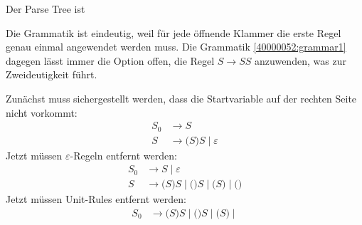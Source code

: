 
\begin{loesung}
\begin{teilaufgaben}
\item Der Parse Tree ist
\begin{center}
\end{center}
\item Die Grammatik ist eindeutig, weil für jede öffnende Klammer die erste 
Regel genau einmal angewendet werden muss. 
Die Grammatik
\eqref{40000052:grammar1} dagegen lässt immer die Option offen, die
Regel $S\to SS$ anzuwenden, was zur Zweideutigkeit führt.
\item Zunächst muss sichergestellt werden, dass die Startvariable auf
der rechten Seite nicht vorkommt:
\begin{align*}
S_0&\rightarrow S
\\
S&\rightarrow \texttt{(} S \texttt{)} S \;|\; \varepsilon
\end{align*}
Jetzt müssen $\varepsilon$-Regeln entfernt werden:
\begin{align*}
S_0&\rightarrow
S
\;|\;
\varepsilon
\\
S&\rightarrow
\texttt{(} S \texttt{)} S \;|\;
\texttt{(}  \texttt{)} S \;|\;
\texttt{(} S \texttt{)}  \;|\;
\texttt{(}  \texttt{)} 
\end{align*}
Jetzt müssen Unit-Rules entfernt werden:
\begin{align*}
S_0&\rightarrow
\texttt{(} S \texttt{)} S \;|\;
\texttt{(}  \texttt{)} S \;|\;
\texttt{(} S \texttt{)}  \;|\;

\end{align*}
\end{teilaufgaben}
\end{loesung}
